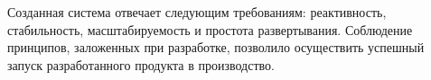 \documentclass[a4paper,14pt,href,draft]{article}
\begin{document}
Созданная система отвечает следующим требованиям: реактивность, стабильность, масштабируемость и простота развертывания.
Соблюдение принципов, заложенных при разработке, позволило осуществить успешный запуск разработанного продукта в производство.


\newpage
{}



\end{document}
